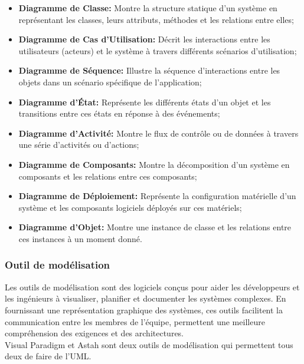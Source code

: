 \documentclass[12pt]{report}
\begin{document}
				\begin{itemize}
					\item \textbf{Diagramme de Classe:} Montre la structure statique d'un système en représentant les classes, leurs attributs, méthodes et les relations entre elles;
					\item \textbf{Diagramme de Cas d'Utilisation:} Décrit les interactions entre les utilisateurs (acteurs) et le système à travers différents scénarios d'utilisation;
					\item \textbf{Diagramme de Séquence:} Illustre la séquence d'interactions entre les objets dans un scénario spécifique de l'application;
					\item \textbf{Diagramme d'État:} Représente les différents états d'un objet et les transitions entre ces états en réponse à des événements;
					\item \textbf{Diagramme d'Activité:} Montre le flux de contrôle ou de données à travers une série d'activités ou d'actions;
					\item \textbf{Diagramme de Composants:} Montre la décomposition d'un système en composants et les relations entre ces composants;
					\item \textbf{Diagramme de Déploiement:} Représente la configuration matérielle d'un système et les composants logiciels déployés sur ces matériels;
					\item \textbf{Diagramme d'Objet:} Montre une instance de classe et les relations entre ces instances à un moment donné.
				\end{itemize}
				


				\subsubsection{Outil de modélisation}

				\hspace{15pt} Les outils de modélisation sont des logiciels conçus pour aider les développeurs et les ingénieurs à visualiser, planifier et documenter les systèmes complexes. En fournissant une représentation graphique des systèmes, ces outils facilitent la communication entre les membres de l'équipe, permettent une meilleure compréhension des exigences et des architectures.\\

				Visual Paradigm et Astah sont deux outils de modélisation qui permettent tous deux de faire de l'UML.\\
\end{document}
